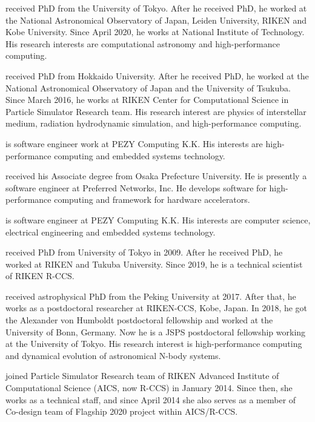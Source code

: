 \documentclass[Afour,sageh,times]{sagej}
\begin{document}
\begin{biogs}
   received PhD from the University of
  Tokyo. After he received PhD, he worked at the National Astronomical
  Observatory of Japan, Leiden University, RIKEN and Kobe
  University. Since April 2020, he works at National Institute of
  Technology. His research interests are computational astronomy and
  high-performance computing.
  
   received PhD from Hokkaido
  University. After he received PhD, he worked at the National
  Astronomical Observatory of Japan and the University of
  Tsukuba. Since March 2016, he works at RIKEN Center for
  Computational Science in Particle Simulator Research team. His
  research interest are physics of interstellar medium, radiation
  hydrodynamic simulation, and high-performance computing.
  
   is software engineer work at PEZY
  Computing K.K.  His interests are high-performance computing and
  embedded systems technology.

   received his Associate degree from
  Osaka Prefecture University.  He is presently a software engineer at
  Preferred Networks, Inc.  He develops software for high-performance
  computing and framework for hardware accelerators.

   is software engineer at PEZY
  Computing K.K.  His interests are computer science, electrical
  engineering and embedded systems technology.

   received PhD from University of Tokyo
  in 2009.  After he received PhD, he worked at RIKEN and Tukuba
  University.  Since 2019, he is a technical scientist of RIKEN R-CCS.

   received astrophysical PhD from the Peking
  University at 2017. After that, he works as a postdoctoral
  researcher at RIKEN-CCS, Kobe, Japan. In 2018, he got the Alexander
  von Humboldt postdoctoral fellowship and worked at the University of
  Bonn, Germany. Now he is a JSPS postdoctoral fellowship working at
  the University of Tokyo. His research interest is high-performance
  computing and dynamical evolution of astronomical N-body systems.

   joined Particle Simulator Research
  team of RIKEN Advanced Institute of Computational Science (AICS, now
  R-CCS) in January 2014.  Since then, she works as a technical staff,
  and since April 2014 she also serves as a member of Co-design team
  of Flagship 2020 project within AICS/R-CCS.


\end{biogs}
\end{document}
